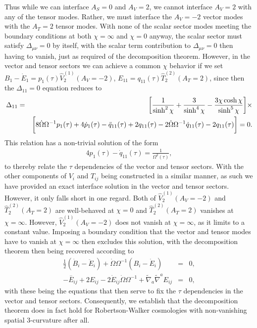 Thus while we can interface $A_S=0$ and $A_V=2$, we cannot interface $A_V=2$ with any of the tensor modes. Rather, we must interface the $A_V=-2$ vector modes with the  $A_T=2$ tensor modes. With none of the scalar sector modes meeting the boundary conditions at both $\chi=\infty$ and $\chi=0$ anyway, the scalar sector must satisfy  $\Delta_{\mu\nu}=0$ by itself, with the scalar term contribution to $\Delta_{\mu\nu}=0$ then having to vanish, just as required of the decomposition theorem. However, in the vector and tensor sectors we can achieve a common $\chi$ behavior if we set $B_1-\dot{E}_1=p_1(\tau)\hat{V}^{(1)}_2(A_V=-2)$, $E_{11}=q_{11}(\tau)\hat{T}^{(2)}_2(A_T=2)$, since then the $\Delta_{11}=0$ equation reduces to
%
\begin{eqnarray}
\Delta_{11}&=&\bigg{[}\frac{1}{\sinh^2\chi}+\frac{3}{\sinh^4\chi}-\frac{3\chi\cosh\chi}{\sinh^5\chi}\bigg{]}\times
\nonumber\\
&&\bigg{[} 8\dot{\Omega} \Omega^{-1}p_1(\tau)+4\dot{p}_1(\tau)- \ddot{q}_{11}(\tau) +2 q_{11}(\tau)  -2\dot{\Omega} \Omega^{-1}\dot{q}_{11}(\tau) -2q_{11}(\tau)\bigg{]}=0.
\nonumber\\
\label{11.5}
\end{eqnarray}
%
This relation has a non-trivial solution of the form
%
\begin{eqnarray}
4p_1(\tau)-\dot{q}_{11}(\tau)=\frac{1}{\Omega^2(\tau)},
\label{11.6}
\end{eqnarray}
%
to thereby relate the $\tau$ dependencies of the vector and tensor sectors. With the other components of $V_i$ and $T_{ij}$ being constructed in a similar manner, as such we have provided an exact interface solution in the vector and tensor sectors. However, it only falls short in one regard. Both of $\hat{V}^{(1)}_2(A_V=-2)$ and $\hat{T}^{(2)}_2(A_T=2)$ are well-behaved at $\chi=0$ and $\hat{T}^{(2)}_2(A_T=2)$ vanishes at $\chi=\infty$. However, $\hat{V}^{(1)}_2(A_V=-2)$ does not vanish at $\chi=\infty$, as it limits to a constant value. Imposing a boundary condition that the vector and tensor modes have to vanish at $\chi=\infty$ then excludes this solution, with the decomposition theorem then being recovered according to 
%
\begin{eqnarray}
\tfrac{1}{2}(\dot{B}_i-\ddot{E}_i)+\dot{\Omega}\Omega^{-1}(B_i-\dot{E}_i)&=&0,
\nonumber\\
- \overset{..}{E}_{ij} +2 E_{ij} - 2 \dot{E}_{ij} \dot{\Omega} \Omega^{-1} + \tilde{\nabla}_{a}\tilde{\nabla}^{a}E_{ij}&=&0,
\label{11.7}
\end{eqnarray}
%
with these being the equations that then serve to fix the $\tau$ dependencies in the vector and tensor sectors.  Consequently, we establish that the decomposition theorem does in fact hold for Robertson-Walker cosmologies with non-vanishing spatial 3-curvature after all. 


